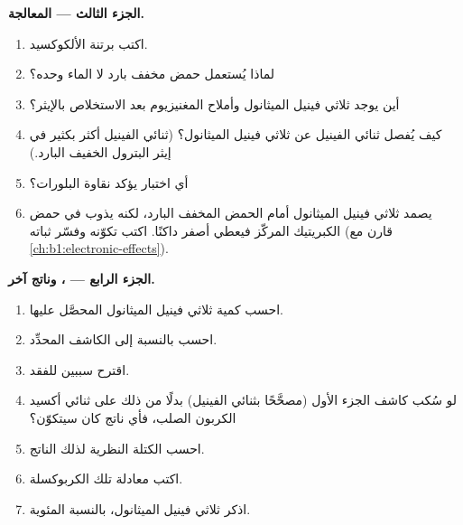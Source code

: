 \begin{problem}
\medskip
\noindent\textbf{الجزء الثالث --- المعالجة.}
\begin{enumerate}[resume]
  \item اكتب برتنة الألكوكسيد.
  \item لماذا يُستعمل حمض مخفف بارد لا الماء وحده؟
  \item أين يوجد ثلاثي فينيل الميثانول وأملاح المغنيزيوم بعد
        الاستخلاص بالإيثر؟
  \item كيف يُفصل ثنائي الفينيل عن ثلاثي فينيل الميثانول؟ (ثنائي الفينيل أكثر
         بكثير في إيثر البترول الخفيف البارد.)
  \item أي اختبار يؤكد نقاوة البلورات؟
  \item يصمد ثلاثي فينيل الميثانول أمام الحمض المخفف البارد، لكنه يذوب في
        حمض الكبريتيك المركّز فيعطي  أصفر داكنًا.
        اكتب تكوّنه وفسّر ثباته (قارن مع
        \cref{ch:b1:electronic-effects}).
\end{enumerate}

\medskip
\noindent\textbf{الجزء الرابع --- ، وناتج آخر.}
\begin{enumerate}[resume]
  \item احسب كمية ثلاثي فينيل الميثانول المحصَّل عليها.
  \item احسب  بالنسبة إلى الكاشف المحدِّد.
  \item اقترح سببين للفقد.
  \item لو سُكب كاشف الجزء الأول (مصحَّحًا بثنائي الفينيل) بدلًا من ذلك
        على ثنائي أكسيد الكربون الصلب، فأي ناتج كان سيتكوّن؟
  \item احسب الكتلة النظرية لذلك الناتج.
  \item اكتب معادلة تلك الكربوكسلة.
  \item اذكر  ثلاثي فينيل الميثانول، بالنسبة المئوية.
\end{enumerate}
\end{problem}
